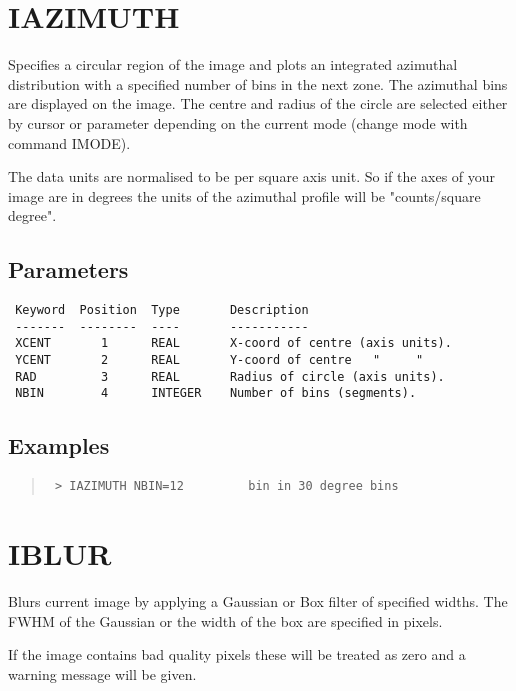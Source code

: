 \documentclass{book}
\renewcommand{\_}{{\tt\char'137}}     %
\begin{document}
\section{IAZIMUTH}
Specifies a circular region of the image and plots an integrated
azimuthal distribution with a specified number of bins in the next
zone. The azimuthal bins are displayed on the image. The centre
and radius of the circle are selected either by cursor or parameter
depending on the current mode (change mode with command IMODE).

The data units are normalised to be per square axis unit. So if
the axes of your image are in degrees the units of the azimuthal
profile will be "counts/square degree".

\subsection{Parameters}
\begin{verbatim}
 Keyword  Position  Type       Description
 -------  --------  ----       -----------
 XCENT       1      REAL       X-coord of centre (axis units).
 YCENT       2      REAL       Y-coord of centre   "     "
 RAD         3      REAL       Radius of circle (axis units).
 NBIN        4      INTEGER    Number of bins (segments).

\end{verbatim}\subsection{Examples}
\begin{quote}\begin{verbatim}
 > IAZIMUTH NBIN=12         bin in 30 degree bins
\end{verbatim}\end{quote}
\section{IBLUR}
Blurs current image by applying a Gaussian or Box filter of specified
widths. The FWHM of the Gaussian or the width of the box are specified
in pixels.

If the image contains bad quality pixels these will be treated as
zero and a warning message will be given.
\end{document}

